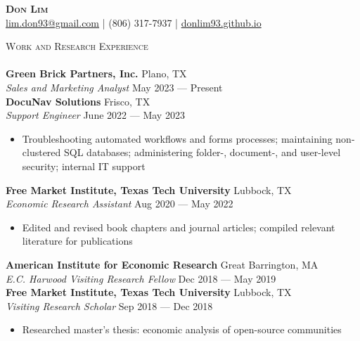 \documentclass[a4paper,11pt]{article}
\newcommand{\lineunder} {
    \vspace*{-8pt} \\
    \hspace*{-18pt} \hrulefill \\
}
\newcommand{\header} [1] {
    {\hspace*{-18pt}\vspace*{6pt} \textsc{\large{#1}}}
    \vspace*{-6pt} \lineunder
}
\begin{document}
\vspace*{-40pt}
\fontsize{10.5}{12}\selectfont

\vspace*{-10pt}
\begin{center}
    {\Huge\textbf\textsc{{{Don Lim}}}}\\
    \href{mailto:lim.don93@gmail.com}{\Letter\space lim.don93@gmail.com} | \Mobilefone\space (806) 317-7937 | \href{https://donlim93.github.io/}{\space donlim93.github.io} \\
\end{center}

\header{Work and Research Experience}
\textbf{Green Brick Partners, Inc.} \hfill \faMapMarker\space Plano, TX \\
\textit{Sales and Marketing Analyst} \hfill \faCalendar\space May 2023 --- Present \\

\textbf{DocuNav Solutions} \hfill \faMapMarker\space Frisco, TX \\
\textit{Support Engineer} \hfill \faCalendar\space June 2022 --- May 2023 \\
\begin{itemize}
    \item Troubleshooting automated workflows and forms processes; maintaining non-clustered SQL databases; administering folder-, document-, and user-level security; internal IT support
\end{itemize}    

\textbf{Free Market Institute, Texas Tech University} \hfill \faMapMarker\space Lubbock, TX\\
\textit{Economic Research Assistant} \hfill \faCalendar\space Aug 2020 --- May 2022 \\
\begin{itemize}
    \item Edited and revised book chapters and journal articles; compiled relevant literature for publications
\end{itemize}

\textbf{American Institute for Economic Research} \hfill \faMapMarker\space Great Barrington, MA\\
\textit{E.C. Harwood Visiting Research Fellow} \hfill \faCalendar\space Dec 2018 --- May 2019\\

\textbf{Free Market Institute, Texas Tech University} \hfill \faMapMarker\space Lubbock, TX\\
\textit{Visiting Research Scholar} \hfill \faCalendar\space Sep 2018 --- Dec 2018\\
\begin{itemize}
    \item Researched master's thesis: economic analysis of open-source communities
\end{itemize}
\end{document}
